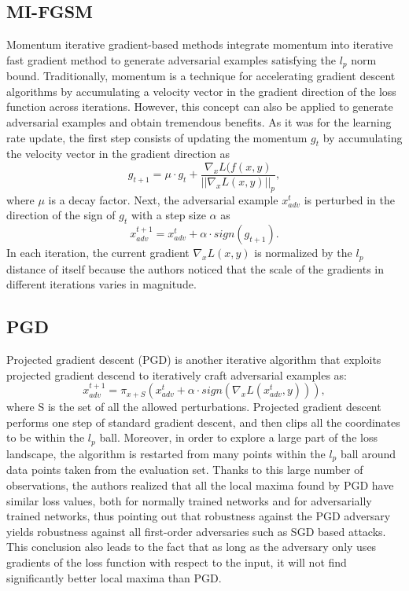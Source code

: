 \subsection{MI-FGSM}
Momentum iterative gradient-based methods \cite{dong2017boosting} integrate momentum into iterative fast gradient method to generate adversarial examples satisfying the \(l_{p}\) norm bound. Traditionally, momentum is a technique for accelerating gradient descent algorithms by accumulating a velocity vector in the gradient direction of the loss function across iterations. However, this concept can also be applied to generate adversarial examples and obtain tremendous benefits. As it was for the learning rate update, the first step consists of updating the momentum \(g_t\) by accumulating the velocity vector in the gradient direction as 
\begin{equation}
g_{t+1}=\mu \cdot g_{t} + \frac{\nabla_x L(f(x, y)}{||\nabla_x L(x, y)||_p},
\end{equation}
where \(\mu\) is a decay factor. Next, the adversarial example \(x_{adv}^{t}\) is perturbed in the direction of the sign of \(g_{t}\) with a step size \(\alpha\) as
\begin{equation}
x_{adv}^{t+1}=x_{adv}^{t}+\alpha \cdot sign(g_{t+1}).
\end{equation}
In each iteration, the current gradient \(\nabla_x L(x, y)\) is normalized by the \(l_{p}\) distance of itself because the authors noticed that the scale of the gradients in different iterations varies in magnitude.

\subsection{PGD}
Projected gradient descent (PGD) \cite{madry2019deep} is another iterative algorithm that exploits projected gradient descend to iteratively craft adversarial examples as:
\begin{equation}
x_{adv}^{t+1}=\pi_{x+S}(x_{adv}^{t} +\alpha \cdot sign(\nabla_x L(x_{adv}^{t}, y))),
\end{equation}
where S is the set of all the allowed perturbations. Projected gradient descent performs one step of standard gradient descent, and then clips all the coordinates to be within the \(l_p\) ball. Moreover, in order to explore a large part of the loss landscape, the algorithm is restarted from many points within the \(l_p\) ball around data points taken from the evaluation set. Thanks to this large number of observations, the authors realized that all the local maxima found by PGD have similar loss values, both for normally trained networks and for adversarially trained networks, thus pointing out that robustness against the PGD adversary yields robustness against all first-order adversaries such as SGD based attacks. This conclusion also leads to the fact that as long as the adversary only uses gradients of the loss function with respect to the input, it will not find significantly better local maxima than PGD.

